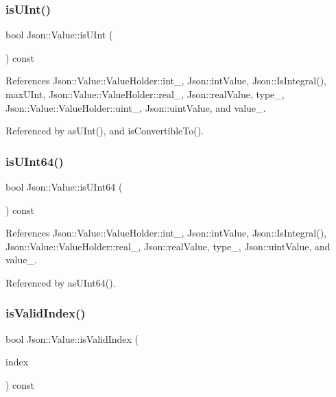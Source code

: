 \subsubsection{\texorpdfstring{is\+U\+Int()}{isUInt()}}
{\footnotesize\ttfamily bool Json\+::\+Value\+::is\+U\+Int (\begin{DoxyParamCaption}{ }\end{DoxyParamCaption}) const}



References Json\+::\+Value\+::\+Value\+Holder\+::int\+\_\+, Json\+::int\+Value, Json\+::\+Is\+Integral(), max\+U\+Int, Json\+::\+Value\+::\+Value\+Holder\+::real\+\_\+, Json\+::real\+Value, type\+\_\+, Json\+::\+Value\+::\+Value\+Holder\+::uint\+\_\+, Json\+::uint\+Value, and value\+\_\+.



Referenced by as\+U\+Int(), and is\+Convertible\+To().

\mbox{\label{classJson_1_1Value_a883576e35cb03a785258edb56777a2de_a883576e35cb03a785258edb56777a2de}} 
\subsubsection{\texorpdfstring{is\+U\+Int64()}{isUInt64()}}
{\footnotesize\ttfamily bool Json\+::\+Value\+::is\+U\+Int64 (\begin{DoxyParamCaption}{ }\end{DoxyParamCaption}) const}



References Json\+::\+Value\+::\+Value\+Holder\+::int\+\_\+, Json\+::int\+Value, Json\+::\+Is\+Integral(), Json\+::\+Value\+::\+Value\+Holder\+::real\+\_\+, Json\+::real\+Value, type\+\_\+, Json\+::uint\+Value, and value\+\_\+.



Referenced by as\+U\+Int64().

\mbox{\label{classJson_1_1Value_ac2928f174a6e081c1500c28c2d61ee93_ac2928f174a6e081c1500c28c2d61ee93}} 
\subsubsection{\texorpdfstring{is\+Valid\+Index()}{isValidIndex()}}
{\footnotesize\ttfamily bool Json\+::\+Value\+::is\+Valid\+Index (\begin{DoxyParamCaption}\item[{\hyperlink{classJson_1_1Value_a184a91566cccca7b819240f0d5561c7d_a184a91566cccca7b819240f0d5561c7d}{Array\+Index}}]{index }\end{DoxyParamCaption}) const}



